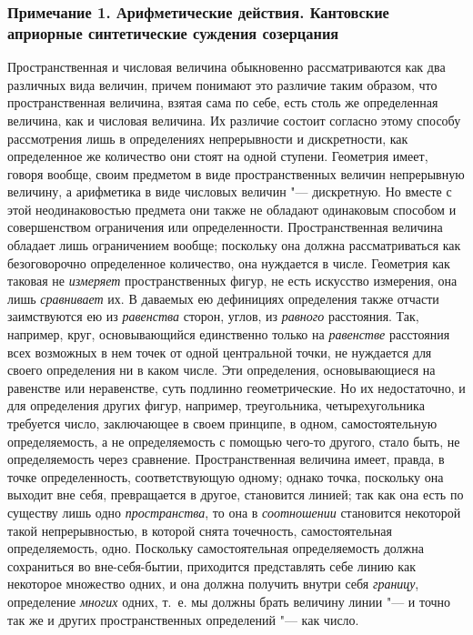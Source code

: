 \subsubsection[Примечание 1. Арифметические действия. Кантовские априорные синтетические суждения созерцания]
{Примечание 1. Арифметические действия. Кантовские априорные синтетические суждения созерцания}

Пространственная и числовая величина обыкновенно рассматриваются как два
различных вида величин, причем понимают это различие таким образом, что
пространственная величина, взятая сама по себе, есть столь же определенная
величина, как и числовая величина. Их различие состоит согласно этому
способу рассмотрения лишь в определениях непрерывности и дискретности, как
определенное же количество они стоят на одной ступени. Геометрия имеет,
говоря вообще, своим предметом в виде пространственных величин непрерывную
величину, а арифметика в виде числовых величин "--- дискретную. Но вместе с
этой неодинаковостью предмета они также не обладают одинаковым способом и
совершенством ограничения или определенности. Пространственная величина
обладает лишь ограничением вообще; поскольку она должна рассматриваться как
безоговорочно определенное количество, она нуждается в числе. Геометрия как
таковая не {\em измеряет} пространственных фигур, не
есть искусство измерения, она лишь {\em сравнивает} их.
В даваемых ею дефинициях определения также отчасти заимствуются ею из
{\em равенства} сторон, углов, из
{\em равного} расстояния. Так, например, круг,
основывающийся единственно только на {\em равенстве}
расстояния всех возможных в нем точек от одной центральной точки, не
нуждается для своего определения ни в каком числе. Эти определения,
основывающиеся на равенстве или неравенстве, суть подлинно геометрические.
Но их недостаточно, и для определения других фигур, например, треугольника,
четырехугольника требуется число, заключающее в своем принципе, в одном,
самостоятельную определяемость, а не определяемость с помощью чего-то
другого, стало быть, не определяемость через сравнение. Пространственная
величина имеет, правда, в точке определенность, соответствующую одному;
однако точка, поскольку она выходит вне себя, превращается в другое,
становится линией; так как она есть по существу лишь одно
{\em пространства}, то она в
{\em соотношении} становится некоторой такой
непрерывностью, в которой снята точечность, самостоятельная определяемость,
одно. Поскольку самостоятельная определяемость должна сохраниться во
вне-себя-бытии, приходится представлять себе линию как некоторое множество
одних, и она должна получить внутри себя {\em границу},
определение {\em многих} одних, т.~е. мы должны брать
величину линии "--- и точно так же и других пространственных определений "--- как
число.

